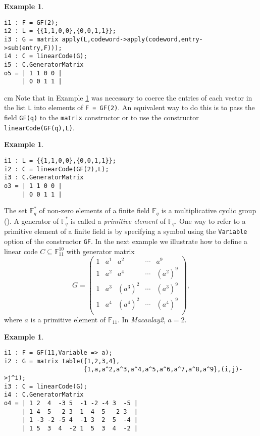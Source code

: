 \documentclass[12pt]{amsart}
\theoremstyle{plain}
\newtheorem{example}[theorem]{Example}
\begin{document}
\begin{example}\label{example_2.1}
 $\,$
\begin{verbatim}
i1 : F = GF(2);
i2 : L = {{1,1,0,0},{0,0,1,1}};
i3 : G = matrix apply(L,codeword->apply(codeword,entry->sub(entry,F)));
i4 : C = linearCode(G);
i5 : C.GeneratorMatrix
o5 = | 1 1 0 0 |
     | 0 0 1 1 |
 \end{verbatim}
\end{example}
 cm
Note that in Example \ref{example_2.1} was necessary to coerce the entries of each vector in the list {\tt L} into elements of {\tt F = GF(2)}. An equivalent way to do this is to pass the field {\tt GF(q)} to the {\tt matrix} constructor or to use the constructor {\tt linearCode(GF(q),L)}.

\begin{example}\label{example_2.2}
 $\,$
\begin{verbatim}
i1 : L = {{1,1,0,0},{0,0,1,1}};
i2 : C = linearCode(GF(2),L);
i3 : C.GeneratorMatrix
o3 = | 1 1 0 0 |
     | 0 0 1 1 |
\end{verbatim}
\end{example}
The set $\mathbb{F}^{\ast}_q$ of non-zero elements of a finite field $\mathbb{F}_q$ is a multiplicative cyclic group (\cite[Theorem 3.3.1]{huf-pless}). A generator of $\mathbb{F}_q^{\ast}$ is called a \textit{primitive element} of $\mathbb{F}_q$. One way to refer to a primitive element of a finite field is by specifying a symbol using the {\tt Variable} option of the constructor {\tt GF}. In the next example we illustrate how to define a linear code  $C\subseteq \mathbb{F}_{11}^{10}$ with generator matrix
\[
 G=
 \begin{pmatrix}
  1 & a^1 & a^2 & \cdots & a^9\\
  1 & a^2 & a^4 & \cdots & (a^2)^9\\
  1 & a^3 & (a^3)^2 & \cdots & (a^3)^9\\
  1 & a^4 & (a^4)^2 & \cdots & (a^4)^9\\
 \end{pmatrix},
\]
where $a$ is a primitive element of $\mathbb{F}_{11}$. In {\it Macaulay2}, $a=2$.

\begin{example}\label{example_2.4}
 $\,$
\begin{verbatim}
i1 : F = GF(11,Variable => a);
i2 : G = matrix table({1,2,3,4},
                      {1,a,a^2,a^3,a^4,a^5,a^6,a^7,a^8,a^9},(i,j)->j^i);
i3 : C = linearCode(G);
i4 : C.GeneratorMatrix
o4 = | 1 2  4  -3 5  -1 -2 -4 3  -5 |
     | 1 4  5  -2 3  1  4  5  -2 3  |
     | 1 -3 -2 -5 4  -1 3  2  5  -4 |
     | 1 5  3  4  -2 1  5  3  4  -2 |
\end{verbatim}
\end{example}
\end{document}
